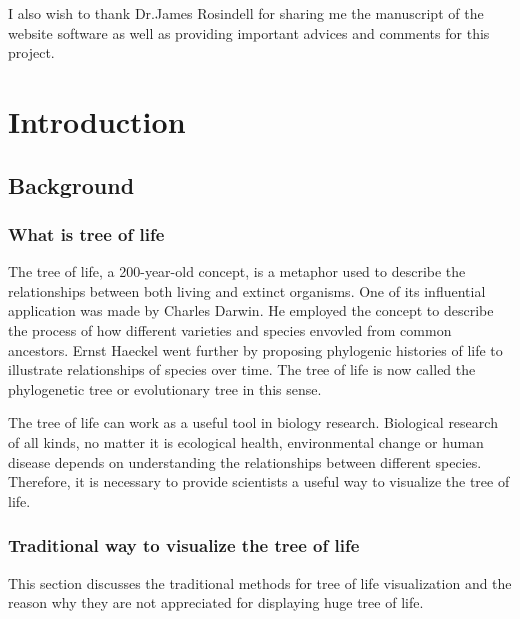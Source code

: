 \documentclass[MSc]{icldt}
\begin{document}
I also wish to thank Dr.James Rosindell for sharing me the manuscript of the website software as well as providing important advices and comments for this project.


\makededication

\tableofcontents
\listoftables
\listoffigures

\chapter{Introduction}

\section{Background}

\subsection{What is tree of life}
The tree of life, a 200-year-old concept,  is a metaphor used to describe the relationships between both living and extinct organisms. One of its influential application was made by Charles Darwin. He employed the concept to describe the process of how different varieties and species envovled  from common ancestors. Ernst Haeckel went further by proposing phylogenic histories of life to illustrate relationships of species over time. The tree of life is now called the phylogenetic tree or evolutionary tree in this sense.\cite{treeOfLifeDefine}\cite{phylogeneticTree}


The tree of life can work as a useful tool in biology research. Biological research of all kinds, no matter it is ecological health, environmental change or human disease depends on understanding the relationships between different species.\cite{treeOfLifeDefine} Therefore, it is necessary to provide scientists a useful way to visualize the tree of life.

\subsection{Traditional way to visualize the tree of life}

This section discusses the traditional methods for tree of life visualization and the reason why they are not appreciated for displaying huge tree of life.
\end{document}

